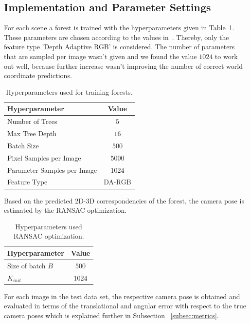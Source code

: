 \documentclass[final]{cvpr}
\begin{document}
\subsection{Implementation and Parameter Settings}
For each scene a forest is trained with the hyperparameters given in Table~\ref{tab:params-forest}. These parameters are 
chosen according to the values in~\cite{shotton2013}. Thereby, only the feature type 'Depth Adaptive RGB' is considered. The number of 
parameters that are sampled per image wasn't given and we found the value $1024$ to work out well, because further increase wasn't 
improving the number of correct world coordinate predictions.
\begin{table}[h!]
	\begin{center}
	\begin{tabular}{|l|c|}
	\hline
	Hyperparameter & Value \\
	\hline\hline
	Number of Trees & $5$ \\
	Max Tree Depth & $16$ \\
	Batch Size & $500$ \\
	Pixel Samples per Image & $5000$ \\
	Parameter Samples per Image  & $1024$ \\
	Feature Type & DA-RGB \\
	\hline
	\end{tabular}
	\end{center}
	\label{tab:params-forest}
	\caption{Hyperparameters used for training forests.}
\end{table}



Based on the predicted 2D-3D correspondencies of the forest, the camera pose is estimated by the RANSAC optimization.
\begin{table}[h!]
	\begin{center}
	\begin{tabular}{|l|c|}
	\hline
	Hyperparameter & Value \\
	\hline\hline
	Size of batch $B$ & $500$ \\
	$K_{init}$ & $1024$ \\
	
	\hline
	\end{tabular}
	\end{center}
	\label{tab:params-ransac}
	\caption{Hyperparameters used RANSAC optimization.}
\end{table}


For each image in the test data set, the respective camera pose is obtained and evaluated in terms of the translational 
and angular error with respect to the true camera poses which is explained further in Subsection ~\ref{subsec:metrics}.
 
\end{document}
